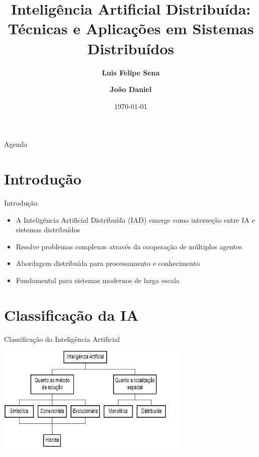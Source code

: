 \documentclass[aspectratio=169,xcolor=table]{beamer}
\author[Sena, Luis Felipe; Daniel, João]{%
  \textbf{Luis Felipe Sena} \and \textbf{João Daniel}
}
\title{Inteligência Artificial Distribuída: Técnicas e Aplicações em Sistemas Distribuídos}
\institute{Universidade Federal da Bahia \\ Instituto de Computação}
\date{\today}
\begin{document}
\begin{frame}
    \titlepage
\end{frame}

\begin{frame}{Agenda}
    \tableofcontents
\end{frame}

\setlength{\parskip}{1em}

\section{Introdução}
\begin{frame}{Introdução}
    \begin{itemize}
        \item A Inteligência Artificial Distribuída (IAD) emerge como interseção entre IA e sistemas distribuídos
        \item Resolve problemas complexos através da cooperação de múltiplos agentes
        \item Abordagem distribuída para processamento e conhecimento
        \item Fundamental para sistemas modernos de larga escala
    \end{itemize}
\end{frame}

\section{Classificação da IA}
\begin{frame}{Classificação da Inteligência Artificial}
    \begin{center}
        \includegraphics[width=0.7\textwidth]{IAD.jpg}
    \end{center}
\end{frame}
\end{document}
